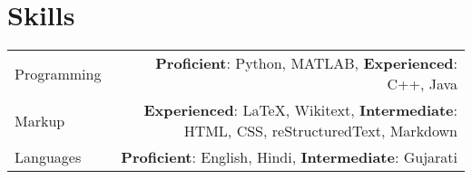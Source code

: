 \documentclass{article}
\begin{document}
\section*{Skills}

\begin{tabular}{L!{\vrule}R}
	Programming & \textbf{Proficient}: Python, MATLAB, \textbf{Experienced}: C++, Java\\
	Markup & \textbf{Experienced}: LaTeX, Wikitext, \textbf{Intermediate}:  HTML, CSS, reStructuredText, Markdown \\
	Languages & \textbf{Proficient}: English, Hindi, \textbf{Intermediate}: Gujarati
\end{tabular}
\end{document}
